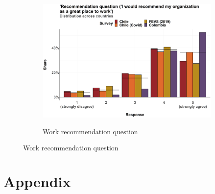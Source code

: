 \documentclass{article}
\begin{document}
\clearpage

\begin{figure}[htbp]\ContinuedFloat
\centering
\begin{adjustbox}{max width=1.6\linewidth,center}
\begin{subfigure}{1.2\textwidth}
\caption{\large{Work recommendation question}}
\includegraphics[width= 1\linewidth]{Figures_manual/Variation across countries - recommend_q.png}
\label{fig:dist_recommend_q}
\end{subfigure}

\end{adjustbox}
\label{fig:chile_sample_ci_3}
\end{figure}

\section{Appendix}
\end{document}
